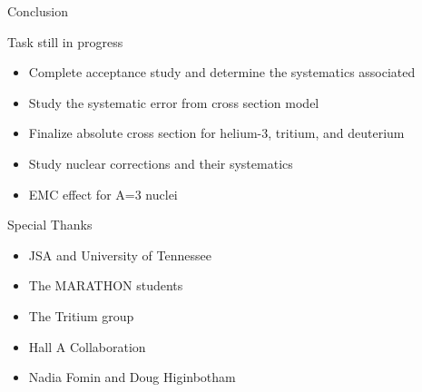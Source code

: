 \documentclass{beamer}
\begin{document}
\begin{frame}{Conclusion}
	\begin{block}{Task still in progress}
		\begin{itemize}
			\item Complete acceptance study and determine the systematics associated
			\item Study the systematic error from cross section model
			\item Finalize absolute cross section for helium-3, tritium, and deuterium 
			\item Study nuclear corrections and their systematics
			\item EMC effect for A=3 nuclei
		\end{itemize}
	\end{block}	
	\begin{block}{Special Thanks}
	\begin{itemize}
		\item JSA and University of Tennessee
		\item The MARATHON students
		\item The Tritium group 
		\item Hall A Collaboration
		\item Nadia Fomin and Doug Higinbotham
	\end{itemize}
\end{block}
\end{frame}
	
	
\end{document}
